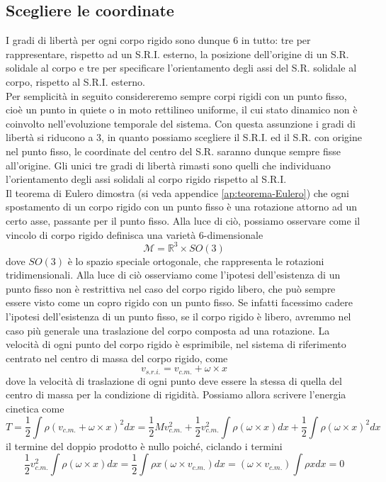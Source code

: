 \documentclass[
10pt, %
a4paper, %
oneside, %
headinclude,footinclude, %
BCOR5mm, %
]{scrartcl}
\begin{document}
\subsection{Scegliere le coordinate}
I gradi di libertà per ogni corpo rigido sono dunque 6 in tutto: tre per rappresentare, rispetto ad un S.R.I. esterno, la posizione dell'origine di un S.R. solidale al corpo e tre per specificare l'orientamento degli assi del S.R. solidale al corpo, rispetto al S.R.I. esterno.\\
Per semplicità in seguito considereremo sempre corpi rigidi con un punto fisso, cioè un punto in quiete o in moto rettilineo uniforme, il cui stato dinamico non è coinvolto nell'evoluzione temporale del sistema. Con questa assunzione i gradi di libertà si riducono a 3, in quanto possiamo scegliere il S.R.I. ed il S.R. con origine nel punto fisso, le coordinate del centro del S.R. saranno dunque sempre fisse all'origine. Gli unici tre gradi di libertà rimasti sono quelli che individuano l'orientamento degli assi solidali al corpo rigido rispetto al S.R.I.\\
Il teorema di Eulero dimostra (si veda appendice \ref{ap:teorema-Eulero}) che ogni spostamento di un corpo rigido con un punto fisso è una rotazione attorno ad un certo asse, passante per il punto fisso. Alla luce di ciò, possiamo osservare come il vincolo di corpo rigido definisca una varietà 6-dimensionale
\[\mathcal{M} = \mathbb{R}^3\times SO(3)\]
dove \(SO(3)\) è lo spazio speciale ortogonale, che rappresenta le rotazioni tridimensionali.
Alla luce di ciò osserviamo come l'ipotesi dell'esistenza di un punto fisso non è restrittiva nel caso del corpo rigido libero, che può sempre essere visto come un copro rigido con un punto fisso. Se infatti facessimo cadere l'ipotesi dell'esistenza di un punto fisso, se il corpo rigido è libero, avremmo nel caso più generale una traslazione del corpo composta ad una rotazione. La velocità di ogni punto del corpo rigido è esprimibile, nel sistema di riferimento centrato nel centro di massa del corpo rigido, come
\[v_{s.r.i.} =v_{c.m.}+\omega\times x \]
dove la velocità di traslazione di ogni punto deve essere la stessa di quella del centro di massa per la condizione di rigidità.  Possiamo allora scrivere l'energia cinetica come
\[T = \frac{1}{2}\int\rho(v_{c.m.}+\omega\times x)^2dx = \frac{1}{2}Mv_{c.m.}^2+\frac{1}{2}v_{c.m.}^2\int\rho(\omega\times x)dx+\frac{1}{2}\int\rho (\omega\times x)^2 dx\]
il termine del doppio prodotto è nullo poiché, ciclando i termini
\[\frac{1}{2}v_{c.m.}^2\int\rho(\omega\times x)dx = \frac{1}{2}\int \rho x (\omega\times v_{c.m.})dx  = (\omega\times v_{c.m.})\int \rho x dx= 0 \]
\end{document}
